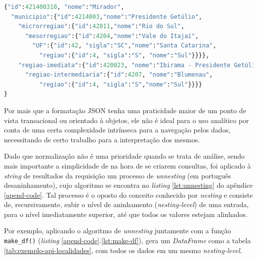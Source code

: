 \begin{lstlisting}[float = h, label={lst:exemplo-api-localidades},language=Python, caption=Exemplo de resultado de uma requisição da API de localidades.]
{"id":421400310, "nome":"Mirador",
  "municipio":{"id":4214003,"nome":"Presidente Getúlio",
    "microrregiao":{"id":42011,"nome":"Rio do Sul",
      "mesorregiao":{"id":4204,"nome":"Vale do Itajaí",
        "UF":{"id":42, "sigla":"SC","nome":"Santa Catarina",
          "regiao":{"id":4, "sigla":"S", "nome":"Sul"}}}},
    "regiao-imediata":{"id":420023, "nome":"Ibirama - Presidente Getúlio",
      "regiao-intermediaria":{"id":4207, "nome":"Blumenau",
          "regiao":{"id":4, "sigla":"S","nome":"Sul"}}}}
}
\end{lstlisting}

    
    Por mais que a formatação JSON tenha uma praticidade maior de um ponto de vista transacional ou orientado à objetos, ele não é ideal para o uso analítico por conta de uma certa complexidade intrínseca para a navegação pelos dados, necessitando de certo trabalho para a interpretação dos mesmos. 
    
    Dado que normalização não é uma prioridade quando se trata de análise, sendo mais importante a simplicidade de na hora de se criarem consultas, foi aplicado à \textit{string} de resultados da requisição um processo de \textit{unnesting} (em português desaninhamento), cujo algoritmo se encontra no \textit{listing} \ref{lst:unnesting} do apêndice \ref{apend-code}. Tal processo é o oposto do conceito conhecido por \textit{nesting} e consiste de, recursivamente, subir o nível de aninhamento (\textit{nesting-level}) de uma entrada, para o nível imediatamente superior, até que todos os valores estejam alinhados.

    Por exemplo, aplicando o algoritmo de \textit{unnesting} juntamente com a função \verb|make_df()| (\textit{listing} \ref{apend-code}.\ref{lst:make-df}), gera um \textit{DataFrame} como a tabela \ref{tab:exemplo-api-localidades}, com todos os dados em um mesmo \textit{nesting-level}.

